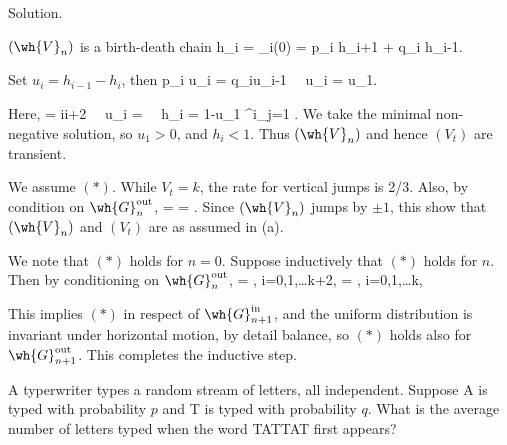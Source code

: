 
Solution. \ben
\item [(a)] $(\wh{V}_n)$ is a birth-death chain
\be
h_i = \pro_i(0) = p_i h_{i+1} + q_i h_{i-1}.
\ee

Set $u_i = h_{i-1} - h_i$, then
\be
p_i u_i = q_iu_{i-1} \ \ra \ u_i = u_1.
\ee

Here,
\be
{} = \frac i{i+2} \ \ra \ u_i =  \ \ra \ h_i = 1-u_1 \sum^i_{j=1} .
\ee
We take the minimal non-negative solution, so $u_1>0$, and $h_i<1$. Thus $(\wh{V}_n)$ and hence $(V_t)$ are transient.

\item [(b)] We assume $(*)$. While $V_t=k$, the rate for vertical jumps is 2/3. Also, by condition on $\wh{G}^{\text{out}}_n$, 
\be
\pro{} =  = .
\ee
Since $(\wh{V}_n)$ jumps by $\pm 1$, this show that $(\wh{V}_n)$ and $(V_t)$ are as assumed in (a).

\item [(c)] We note that $(*)$ holds for $n=0$. Suppose inductively that $(*)$ holds for $n$. Then by conditioning on $\wh{G}^{\text{out}}_n$,
\be
\pro{} = , \quad i=0,1,\dots k+2,
\ee
\be
\pro{} = , \quad i=0,1,\dots k,
\ee

This implies $(*)$ in respect of $\wh{G}^{\text{in}}_{n+1}$, and the uniform distribution is invariant under horizontal motion, by detail balance, so $(*)$ holds also for $\wh{G}^{\text{out}}_{n+1}$. This completes the inductive step.

\een


\begin{exercise}
A typerwriter types a random stream of letters, all independent. Suppose A is typed with probability $p$ and T is typed with probability $q$. What is the average number of letters typed when the word TATTAT first appears?
\end{exercise}


